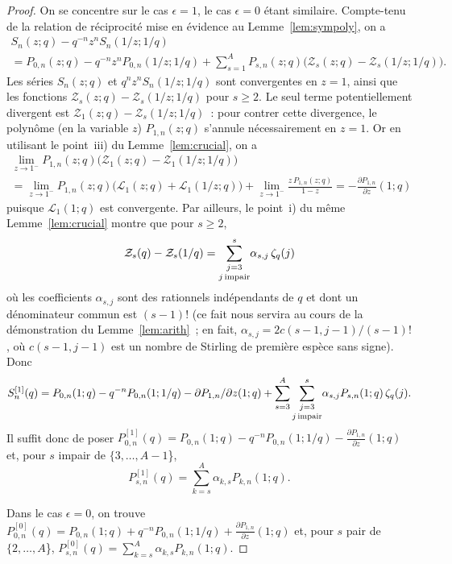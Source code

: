 \documentclass[12pt]{amsart}
\newcommand{\al}{\alpha}
\newcommand{\ep}{\epsilon}
\theoremstyle{remark}
\numberwithin{equation}{section}
\begin{document}
\begin{proof} On se concentre sur le cas $\ep=1$, le cas  $\ep=0$ {\'e}tant
  similaire. Compte-tenu de la relation de r{\'e}ciprocit{\'e} mise en {\'e}vidence au
Lemme~\ref{lem:sympoly}, on a 
\begin{multline*}
S_n(z;q)-q^{-n}z^nS_n(1/z;1/q)
\\=
P_{0,n}(z;q)-q^{-n}z^nP_{0,n}(1/z;1/q)+
\sum_{s=1}^A P_{s,n}(z;q)\bigl(
\mathcal{Z}_s(z;q)-\mathcal{Z}_s(1/z;1/q)\bigr). 
\end{multline*}
Les s{\'e}ries 
$S_n(z;q)$ et $q^nz^nS_n(1/z;1/q)$ sont convergentes en $z=1$, ainsi que les fonctions 
$\mathcal{Z}_s(z;q)-\mathcal{Z}_s(1/z;1/q)$ pour $s\ge 2$. Le seul terme 
potentiellement divergent est 
$\mathcal{Z}_1(z;q)-\mathcal{Z}_s(1/z;1/q)$~:  pour contrer cette divergence, 
le polyn{\^o}me (en la variable $z$) 
$P_{1,n}(z;q)$ s'annule  n{\'e}cessairement en $z=1$. 
Or en utilisant le point~iii) du Lemme~\ref{lem:crucial}, on a 
\begin{multline*}
\lim_{{z\to 1^-}} P_{1,n}(z;q)\bigl(
\mathcal{Z}_1(z;q)-\mathcal{Z}_1(1/z;1/q)\bigr)\\=
\lim_{{z\to 1^-}} P_{1,n}(z;q)\bigl(
\mathcal{L}_1(z;q)+\mathcal{L}_1(1/z;q)\bigr)+
\lim_{{z\to 1^-}}
\frac{z\,P_{1,n}(z;q)}{1-z}=-\frac{\partial P_{1,n} }{\partial z}(1;q)
\end{multline*}
puisque $\mathcal{L}_1(1;q)$ est convergente. 
Par ailleurs, le point~i) du m{\^e}me Lemme~\ref{lem:crucial} montre que
pour $s\ge 2$, 
$$
 \mathcal{Z}_s(q)-\mathcal{Z}_s(1/q)=
\underset{j\,\textup{impair}}{\sum_{{j=3}}^{s}}
\alpha_{s,j}\, \zeta_q(j)
$$
o{\`u} les coefficients $\al_{s,j}$ sont des rationnels ind{\'e}pendants de
$q$ et dont un d{\'e}nominateur commun est 
$(s-1)!$ 
(ce fait nous servira au
cours de la d{\'e}monstration du Lemme~\ref{lem:arith}~; 
en fait,
$\alpha_{s,j}=2c(s-1,j-1)/(s-1)!$, o{\`u} $c(s-1,j-1)$ est un nombre de
Stirling de premi{\`e}re esp{\`e}ce sans signe). 
Donc 
$$
S_n^{[1]}(q)=P_{0,n}(1;q)-q^{-n}P_{0,n}(1;1/q)-
\frac{\partial P_{1,n} }{\partial z}(1;q)+
\sum_{s=3}^{A}\underset{j\,\textup{impair}}
{\sum_{{j=3}}^{s}}\alpha_{s,j}P_{s,n}(1;q)\,\zeta_q(j).
$$
Il suffit donc de poser
$
\displaystyle P_{0,n}^{[1]}(q)=P_{0,n}(1;q)-q^{-n}P_{0,n}(1;1/q)-
\frac{\partial P_{1,n} }{\partial z}(1;q)
$
et, pour $s$ impair de $\{3, \ldots, A-1$\}, 
\begin{equation} \label{eq:S->P} 
\displaystyle P_{s,n}^{[1]}(q)=
\sum_{k=s}^{A}\alpha_{k,s}P_{k,n}(1;q).
\end{equation}

Dans le cas $\ep=0$, on trouve  
$\displaystyle P_{0,n}^{[0]}(q)=P_{0,n}(1;q)+q^{-n}P_{0,n}(1;1/q)+
\frac{\partial P_{1,n} }{\partial z}(1;q)$ 
et, pour $s$ pair de $\{2, \ldots, A$\}, 
$\displaystyle P_{s,n}^{[0]}(q)=
\sum_{k=s}^A\alpha_{k,s}P_{k,n}(1;q).$
\end{proof}
\end{document}
